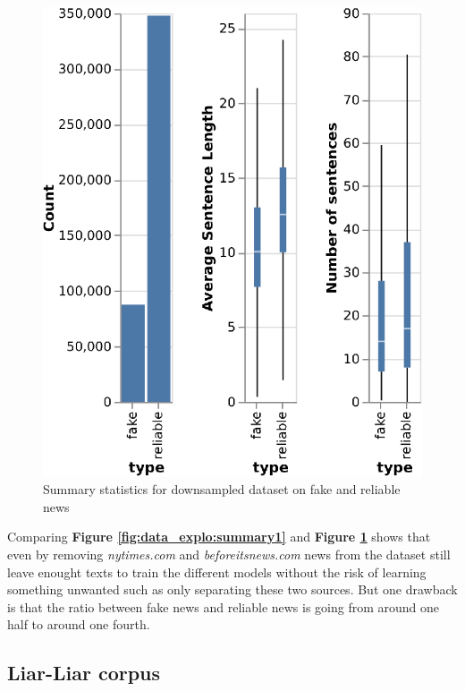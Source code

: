 \begin{figure}[h]
	\centering
	\includegraphics{chapter/images/data_exploration/downsampled.eps}
	\caption{Summary statistics for downsampled dataset on fake and reliable news}
	\label{fig:data_explo:summary2}
\end{figure}

Comparing \textbf{Figure \ref{fig:data_explo:summary1}} and \textbf{Figure \ref{fig:data_explo:summary2}} shows that even by removing \textit{nytimes.com} and \textit{beforeitsnews.com} news from the dataset still leave enought texts to train the different models without the risk of learning something unwanted such as only separating these two sources. But one drawback is that the ratio between fake news and reliable news is going from around one half to around one fourth. 

\subsection{Liar-Liar corpus}
